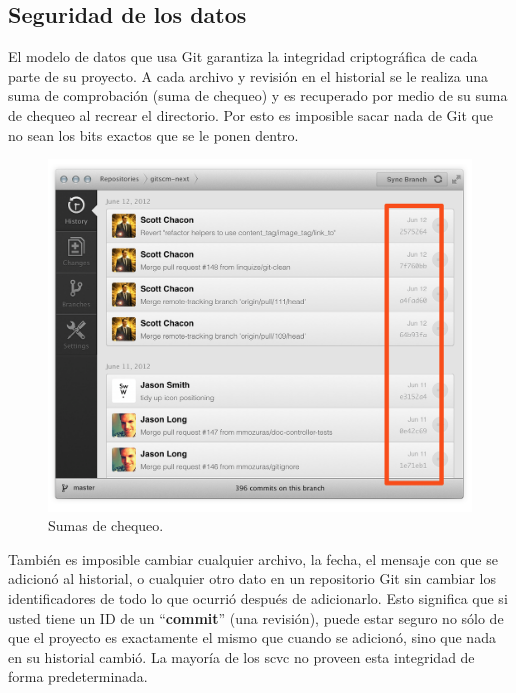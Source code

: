 \documentclass[12pt, spanish, oneside, onecolumn, a4paper]{report}
\begin{document}
\subsection{Seguridad de los datos} 
\label{sec:dataassurance} El modelo de datos que usa Git garantiza la integridad criptográfica de cada parte de su proyecto. A cada archivo y revisión en el historial se le realiza una suma de comprobación (suma de chequeo) y es recuperado por medio de su suma de chequeo al recrear el directorio. Por esto es imposible sacar nada de Git que no sean los bits exactos que se le ponen dentro. 
\begin{figure} 
  \begin{center} 
    \includegraphics[width=.6\textwidth,keepaspectratio=true]{assurance.png} 
  \end{center} 
  \caption{Sumas de chequeo.} 
\end{figure} También es imposible cambiar cualquier archivo, la fecha, el mensaje con que se adicionó al historial, o cualquier otro dato en un repositorio Git sin cambiar los identificadores de todo lo que ocurrió después de adicionarlo. Esto significa que si usted tiene un ID de un ``\textbf{commit}'' (una revisión), puede estar seguro no sólo de que el proyecto es exactamente el mismo que cuando se adicionó, sino que nada en su historial cambió. La mayoría de los 
\gls{scvc} no proveen esta integridad de forma predeterminada. 
\clearpage 
\end{document}
